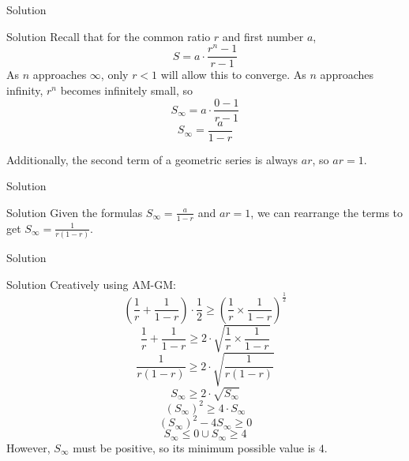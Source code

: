 \begin{namedframe}{Solution}
	\begin{block}{Solution}
		Recall that for the common ratio $r$ and first number $a$,
		\[S = a \cdot \frac{r^n - 1}{r - 1}\]
		As $n$ approaches $\infty$, only $r < 1$ will allow this to converge.
		As $n$ approaches infinity, $r^n$ becomes infinitely small, so
		\[S_{\infty} = a \cdot \frac{0 - 1}{r - 1}\]
		\[S_{\infty} = \frac{a}{1 - r}\]

		Additionally, the second term of a geometric series is always $ar$, so $ar = 1$.
	\end{block}
\end{namedframe}

\begin{namedframe}{Solution}
	\begin{block}{Solution}
		Given the formulas $S_{\infty} = \frac{a}{1 - r}$ and $ar = 1$, we can rearrange the terms to
		get $S_{\infty} = \frac{1}{r(1 - r)}$.
	\end{block}
\end{namedframe}


\begin{namedframe}{Solution}
	\begin{block}{Solution}
		Creatively using AM-GM:
		\footnotesize
		\[ \left( \frac{1}{r} + \frac{1}{1 - r} \right) \cdot \frac{1}{2} \geq \left( \frac{1}{r} \times \frac{1}{1 - r} \right) ^ {\frac{1}{2}} \]
		\[\frac{1}{r} + \frac{1}{1 - r} \geq 2 \cdot \sqrt{\frac{1}{r} \times \frac{1}{1 - r}} \]
		\[\frac{1}{r(1 - r)} \geq 2 \cdot \sqrt{\frac{1}{r(1 - r)}} \]
		\[S_{\infty} \geq 2 \cdot \sqrt{S_{\infty}} \]
		\[(S_{\infty})^2 \geq 4 \cdot S_{\infty} \]
		\[(S_{\infty})^2 - 4 S_{\infty} \geq 0\]
		\[S_{\infty} \leq 0 \cup S_{\infty} \geq 4\]
		However, $S_{\infty}$ must be positive, so its minimum possible value is $4$.
	\end{block}
\end{namedframe}
